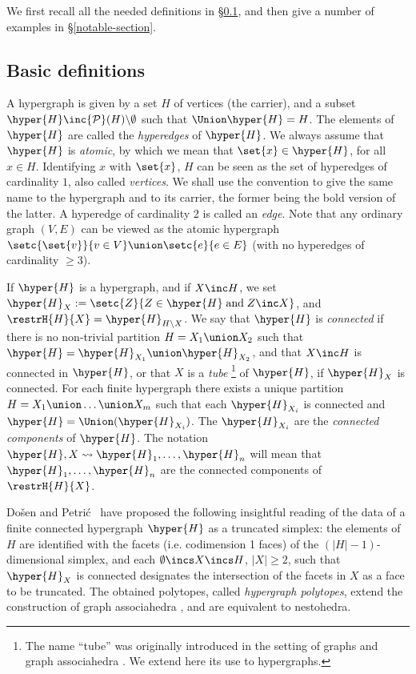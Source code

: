 We first recall all the needed definitions in \S\ref{basic-definitions-section}, and then give a number of examples in \S\ref{notable-section}.

\subsection{Basic definitions} \label{basic-definitions-section}
A hypergraph is given by a set  $H$ of vertices (the carrier), and a subset 
$\hyper{H}\inc {\mathcal{P}}(H)\backslash\emptyset$ such that $\Union \hyper{H}=H$.
 The elements of $\hyper{H}$ are called the {\em hyperedges} of $\hyper{H}$.  
 We always assume that $\hyper{H}$ is {\em atomic}, by which we mean that 
 $\set{x}\in \hyper{H}$, for all $x\in H$. 
 Identifying $x$ with $\set{x}$, $H$ can be seen as the set of  hyperedges of 
 cardinality $1$, also called {\em vertices}. We shall use the convention to 
 give the same name to the hypergraph and to its carrier, the former being 
 the bold version of the latter. 
A hyperedge of cardinality 2 is called an {\em edge}.  Note that any ordinary graph $(V,E)$ can be viewed as the atomic hypergraph
$\setc{\set{v}}{v\in V} \union \setc{e}{e\in E}$ (with no hyperedges of cardinality $\geq 3$). 

If $\hyper{H}$ is a hypergraph,  and if  $X\inc H$, we set
$\hyper{H}_X:=\setc{Z}{Z\in \hyper{H}\;\mbox{and}\; Z\inc X}$, and $\restrH{H}{X}=\hyper{H}_{H\backslash X}$.
We say that $\hyper{H}$ is {\em connected} if there is no non-trivial partition $H=X_1\union X_2$ such that $\hyper{H}=\hyper{H}_{X_1}\union \hyper{H}_{X_2}$, and that $X\inc H$ is connected in $\hyper{H}$, or that $X$ is a {\em tube} \footnote{The name ``tube'' was originally introduced in the setting of graphs and graph associahedra \cite{CD-CCGA}. We extend here its use to hypergraphs.}
of  $\hyper{H}$, if $\hyper{H}_X$ is connected.
For each finite hypergraph there exists a unique partition
$H=X_1\union\ldots\union X_m$ such that each $\hyper{H}_{X_i}$ is connected and $\hyper{H}=\Union(\hyper{H}_{X_i})$.  The $\hyper{H}_{X_i}$ are  the {\em connected components} of $\hyper{H}$. The notation
$\hyper{H},X  \leadsto \hyper{H}_1,\ldots, \hyper{H}_n$
 will mean that  $\hyper{H}_1,\ldots,\hyper{H}_n$ are  the
 connected components of $\restrH{H}{X}$.  

Do\v sen and Petri\'c~\cite{DP} have proposed the following insightful reading of the data of a finite connected hypergraph $\hyper{H}$ as a truncated simplex: the elements of $H$ are identified with the facets (i.e. codimension 1 faces) of the $(|H|-1)$-dimensional simplex, and each $\emptyset\incs X\incs H$, $|X|\geq 2$, such that    $\hyper{H}_X$ is connected designates the intersection of the facets in $X$ as a face to be truncated. The obtained polytopes, called \emph{hypergraph polytopes}, extend the construction of graph associahedra \cite{CD-CCGA, Zel06}, and are equivalent to nestohedra.

